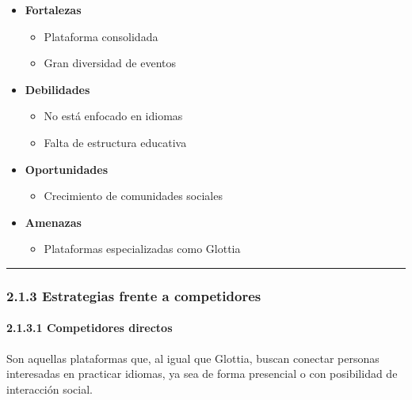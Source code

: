 \begin{itemize}
\tightlist
\item
  \textbf{Fortalezas}

  \begin{itemize}
  \tightlist
  \item
    Plataforma consolidada
  \item
    Gran diversidad de eventos
  \end{itemize}
\item
  \textbf{Debilidades}

  \begin{itemize}
  \tightlist
  \item
    No está enfocado en idiomas
  \item
    Falta de estructura educativa
  \end{itemize}
\item
  \textbf{Oportunidades}

  \begin{itemize}
  \tightlist
  \item
    Crecimiento de comunidades sociales
  \end{itemize}
\item
  \textbf{Amenazas}

  \begin{itemize}
  \tightlist
  \item
    Plataformas especializadas como Glottia
  \end{itemize}
\end{itemize}

\begin{center}\rule{0.5\linewidth}{0.5pt}\end{center}

\subsubsection{2.1.3 Estrategias frente a
competidores}\label{report__20-cap2-requirements-analysis.md__estrategias-frente-a-competidores}

\paragraph{2.1.3.1 Competidores
directos}\label{report__20-cap2-requirements-analysis.md__competidores-directos}

Son aquellas plataformas que, al igual que Glottia, buscan conectar
personas interesadas en practicar idiomas, ya sea de forma presencial o
con posibilidad de interacción social.

